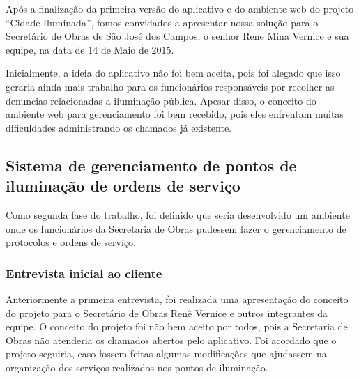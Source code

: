 \documentclass[
	article,			%
	11pt,				%
	oneside,			%
	a4paper,			%
	english,			%
	brazil,				%
	sumario=tradicional
	]{abntex2}
\begin{document}
Após a finalização da primeira versão do aplicativo e do ambiente web do
projeto “Cidade Iluminada”, fomos convidados a apresentar nossa solução para o
Secretário de Obras de São José dos Campos, o senhor Rene Mina Vernice e sua
equipe, na data de 14 de Maio de 2015.

Inicialmente, a ideia do aplicativo não foi bem aceita, pois foi alegado que
isso geraria ainda mais trabalho para os funcionários responsáveis por
recolher as denuncias relacionadas a iluminação pública. Apesar disso, o
conceito do ambiente web para gerenciamento foi bem recebido, pois eles
enfrentam muitas dificuldades administrando os chamados já existente.

\subsection{Sistema de gerenciamento de pontos de iluminação de ordens de serviço}

Como segunda fase do trabalho, foi definido que seria desenvolvido um ambiente
onde os funcionários da Secretaria de Obras pudessem fazer o gerenciamento de
protocolos e ordens de serviço.

\subsubsection{Entrevista inicial ao cliente}

Anteriormente a primeira entrevista, foi realizada uma apresentação do conceito
do projeto para o Secretário de Obras Renê Vernice e outros integrantes da
equipe. O conceito do projeto foi não bem aceito por todos, pois a Secretaria
de Obras não atenderia os chamados abertos pelo aplicativo. Foi acordado que o
projeto seguiria, caso fossem feitas algumas modificações que ajudassem na
organização dos serviços realizados nos pontos de iluminação.
\end{document}
